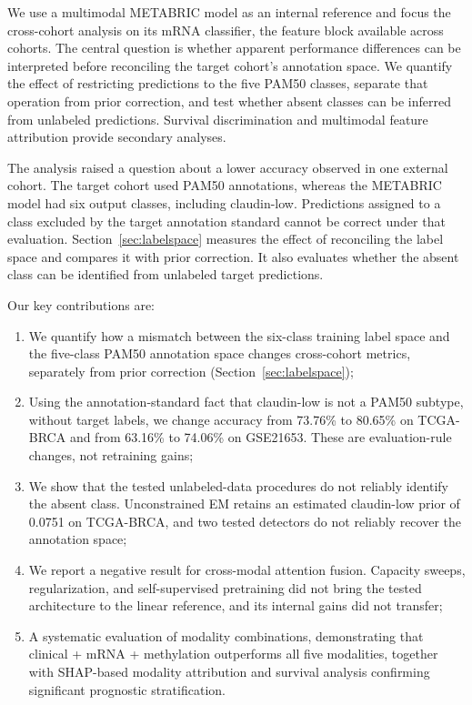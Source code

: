 \documentclass[10pt,journal,compsoc,twocolumn]{IEEEtran}
\begin{document}
We use a multimodal METABRIC model as an internal reference and focus the cross-cohort analysis on its mRNA classifier, the feature block available across cohorts. The central question is whether apparent performance differences can be interpreted before reconciling the target cohort's annotation space. We quantify the effect of restricting predictions to the five PAM50 classes, separate that operation from prior correction, and test whether absent classes can be inferred from unlabeled predictions. Survival discrimination and multimodal feature attribution provide secondary analyses.

The analysis raised a question about a lower accuracy observed in one external cohort. The target cohort used PAM50 annotations, whereas the METABRIC model had six output classes, including claudin-low. Predictions assigned to a class excluded by the target annotation standard cannot be correct under that evaluation. Section~\ref{sec:labelspace} measures the effect of reconciling the label space and compares it with prior correction. It also evaluates whether the absent class can be identified from unlabeled target predictions.

Our key contributions are:
\begin{enumerate}
  \item We quantify how a mismatch between the six-class training label space and the five-class PAM50 annotation space changes cross-cohort metrics, separately from prior correction (Section~\ref{sec:labelspace});
  \item Using the annotation-standard fact that claudin-low is not a PAM50 subtype, without target labels, we change accuracy from 73.76\% to 80.65\% on TCGA-BRCA and from 63.16\% to 74.06\% on GSE21653. These are evaluation-rule changes, not retraining gains;
  \item We show that the tested unlabeled-data procedures do not reliably identify the absent class. Unconstrained EM retains an estimated claudin-low prior of 0.0751 on TCGA-BRCA, and two tested detectors do not reliably recover the annotation space;
  \item We report a negative result for cross-modal attention fusion. Capacity sweeps, regularization, and self-supervised pretraining did not bring the tested architecture to the linear reference, and its internal gains did not transfer;
  \item A systematic evaluation of modality combinations, demonstrating that clinical + mRNA + methylation outperforms all five modalities, together with SHAP-based modality attribution and survival analysis confirming significant prognostic stratification.
\end{enumerate}
\end{document}
